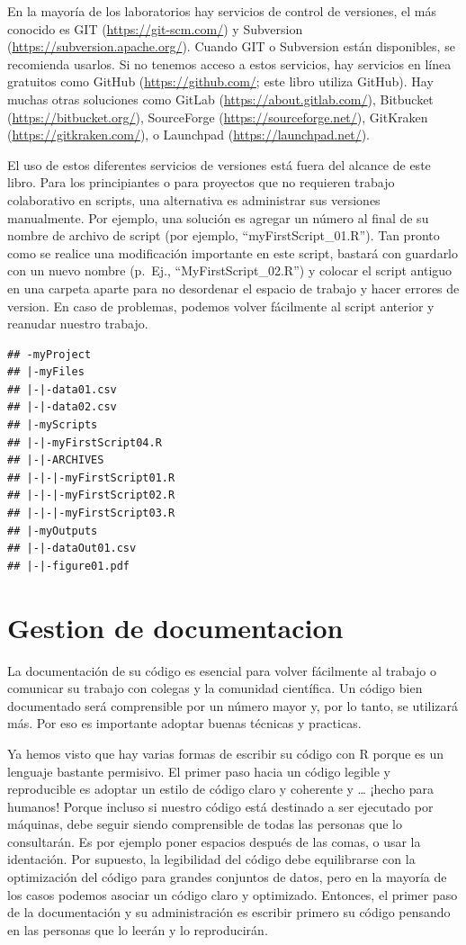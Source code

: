 \documentclass[
]{book}
\begin{document}
En la mayoría de los laboratorios hay servicios de control de versiones, el más conocido es GIT (\url{https://git-scm.com/}) y Subversion (\url{https://subversion.apache.org/}). Cuando GIT o Subversion están disponibles, se recomienda usarlos. Si no tenemos acceso a estos servicios, hay servicios en línea gratuitos como GitHub (\url{https://github.com/}; este libro utiliza GitHub). Hay muchas otras soluciones como GitLab (\url{https://about.gitlab.com/}), Bitbucket (\url{https://bitbucket.org/}), SourceForge (\url{https://sourceforge.net/}), GitKraken (\url{https://gitkraken.com/}), o Launchpad (\url{https://launchpad.net/}).

El uso de estos diferentes servicios de versiones está fuera del alcance de este libro. Para los principiantes o para proyectos que no requieren trabajo colaborativo en scripts, una alternativa es administrar sus versiones manualmente. Por ejemplo, una solución es agregar un número al final de su nombre de archivo de script (por ejemplo, ``myFirstScript\_01.R''). Tan pronto como se realice una modificación importante en este script, bastará con guardarlo con un nuevo nombre (p.~Ej., ``MyFirstScript\_02.R'') y colocar el script antiguo en una carpeta aparte para no desordenar el espacio de trabajo y hacer errores de version. En caso de problemas, podemos volver fácilmente al script anterior y reanudar nuestro trabajo.

\begin{verbatim}
## -myProject
## |-myFiles
## |-|-data01.csv
## |-|-data02.csv
## |-myScripts
## |-|-myFirstScript04.R
## |-|-ARCHIVES
## |-|-|-myFirstScript01.R
## |-|-|-myFirstScript02.R
## |-|-|-myFirstScript03.R
## |-myOutputs
## |-|-dataOut01.csv
## |-|-figure01.pdf
\end{verbatim}

\hypertarget{gestion-de-documentacion}{%
\section{Gestion de documentacion}\label{gestion-de-documentacion}}

La documentación de su código es esencial para volver fácilmente al trabajo o comunicar su trabajo con colegas y la comunidad científica. Un código bien documentado será comprensible por un número mayor y, por lo tanto, se utilizará más. Por eso es importante adoptar buenas técnicas y practicas.

Ya hemos visto que hay varias formas de escribir su código con R porque es un lenguaje bastante permisivo. El primer paso hacia un código legible y reproducible es adoptar un estilo de código claro y coherente y \ldots{} ¡hecho para humanos! Porque incluso si nuestro código está destinado a ser ejecutado por máquinas, debe seguir siendo comprensible de todas las personas que lo consultarán. Es por ejemplo poner espacios después de las comas, o usar la identación. Por supuesto, la legibilidad del código debe equilibrarse con la optimización del código para grandes conjuntos de datos, pero en la mayoría de los casos podemos asociar un código claro y optimizado. Entonces, el primer paso de la documentación y su administración es escribir primero su código pensando en las personas que lo leerán y lo reproducirán.
\end{document}
